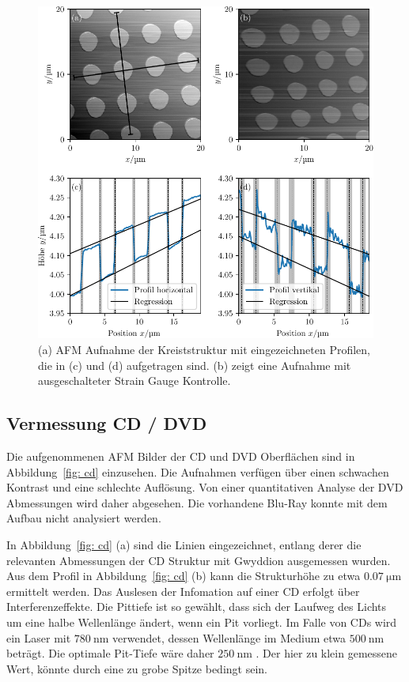 \begin{figure}
  \centering
  \includegraphics[scale = 1]{../analysis/data/nanostruktur_kreise/kreise_profile.pdf}
  \caption{(a) AFM Aufnahme der Kreiststruktur mit eingezeichneten Profilen, die in (c) und (d) aufgetragen sind.
    (b) zeigt eine Aufnahme mit ausgeschalteter Strain Gauge Kontrolle.}
  \label{fig: kreise_profil}
\end{figure}

\FloatBarrier
\subsection{Vermessung CD / DVD}
Die aufgenommenen AFM Bilder der CD und DVD Oberflächen sind in Abbildung~\ref{fig: cd} einzusehen.
Die Aufnahmen verfügen über einen schwachen Kontrast und eine schlechte Auflösung. Von einer
quantitativen Analyse der DVD Abmessungen wird daher abgesehen. Die vorhandene Blu-Ray
konnte mit dem Aufbau nicht analysiert werden.

In Abbildung~\ref{fig: cd} (a) sind die Linien eingezeichnet, entlang derer die relevanten Abmessungen der
CD Struktur mit Gwyddion ausgemessen wurden. Aus dem Profil in Abbildung~\ref{fig: cd} (b) kann die
Strukturhöhe zu etwa $\SI{0.07}{\micro\meter}$ ermittelt werden. Das Auslesen der Infomation auf einer
CD erfolgt über Interferenzeffekte. Die Pittiefe ist so gewählt, dass sich der Laufweg des Lichts
um eine halbe Wellenlänge ändert, wenn ein Pit vorliegt. Im Falle von CDs wird ein Laser mit $\SI{780}{\nano\meter}$
verwendet, dessen Wellenlänge im Medium etwa $\SI{500}{\nano\meter}$ beträgt. Die optimale Pit-Tiefe wäre daher
$\SI{250}{\nano\meter}$ \cite{cd_theorie}. Der hier zu klein gemessene Wert, könnte durch eine zu grobe Spitze
bedingt sein.

